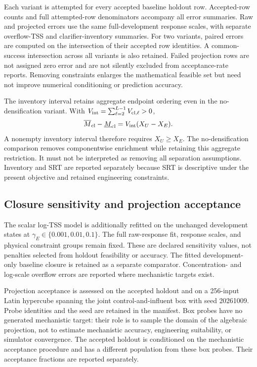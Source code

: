 \documentclass[a4paper,fleqn]{cas-sc}
\begin{document}
Each variant is attempted for every accepted baseline holdout row. Accepted-row counts and full attempted-row denominators accompany all error summaries. Raw and projected errors use the same full-development response scales, with separate overflow-TSS and clarifier-inventory summaries. For two variants, paired errors are computed on the intersection of their accepted row identities. A common-success intersection across all variants is also retained. Failed projection rows are not assigned zero error and are not silently excluded from acceptance-rate reports. Removing constraints enlarges the mathematical feasible set but need not improve numerical conditioning or prediction accuracy.

The inventory interval retains aggregate endpoint ordering even in the no-densification variant. With $V_{\rm int}=\sum_{\ell=2}^{L-1}V_{{\rm cl},\ell}>0$,
\begin{equation}
\overline M_{\rm cl}-\underline M_{\rm cl}
=V_{\rm int}(X_U-X_E).
\label{eq:Sinventorywidth}
\end{equation}
A nonempty inventory interval therefore requires $X_U\ge X_E$. The no-densification comparison removes componentwise enrichment while retaining this aggregate restriction. It must not be interpreted as removing all separation assumptions. Inventory and SRT are reported separately because SRT is descriptive under the present objective and retained engineering constraints.

\subsection{Closure sensitivity and projection acceptance}

The scalar log-TSS model is additionally refitted on the unchanged development states at $\gamma_E\in\{0.001,0.01,0.1\}$. The full raw-response fit, response scales, and physical constraint groups remain fixed. These are declared sensitivity values, not penalties selected from holdout feasibility or accuracy. The fitted development-only baseline closure is retained as a separate comparator. Concentration- and log-scale overflow errors are reported where mechanistic targets exist.

Projection acceptance is assessed on the accepted holdout and on a 256-input Latin hypercube spanning the joint control-and-influent box with seed 20261009. Probe identities and the seed are retained in the manifest. Box probes have no generated mechanistic target: their role is to sample the domain of the algebraic projection, not to estimate mechanistic accuracy, engineering suitability, or simulator convergence. The accepted holdout is conditioned on the mechanistic acceptance procedure and has a different population from these box probes. Their acceptance fractions are reported separately.
\end{document}

